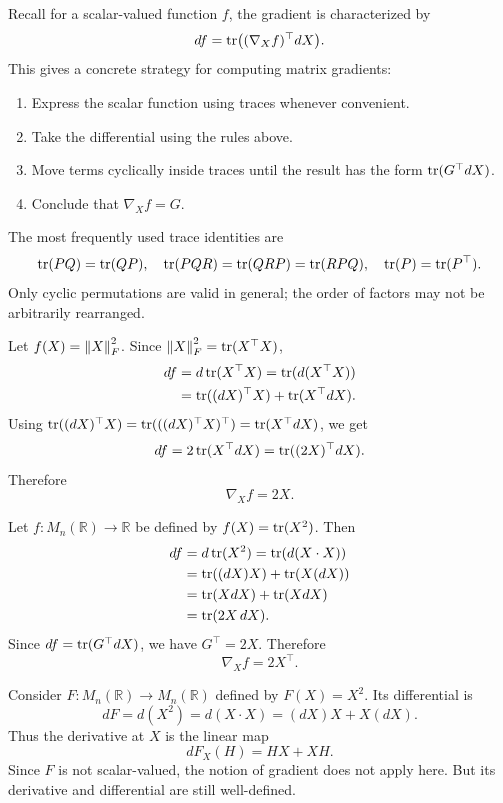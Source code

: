 Recall for a scalar-valued function $f$, the gradient is characterized by
\[
    df=\operatorname{tr}\bigl((\nabla_X f)^{\top} dX\bigr).
\]
This gives a concrete strategy for computing matrix gradients:
\begin{pbox}
 \begin{enumerate}
    \item Express the scalar function using traces whenever convenient.
    \item Take the differential using the rules above.
    \item Move terms cyclically inside traces until the result has the form $\operatorname{tr}(G^{\top} dX)$.
    \item Conclude that $\nabla_X f=G$.
\end{enumerate}   
\end{pbox}

The most frequently used trace identities are
\[
    \operatorname{tr}(PQ)=\operatorname{tr}(QP),
    \quad
    \operatorname{tr}(PQR)=\operatorname{tr}(QRP)=\operatorname{tr}(RPQ),
    \quad
    \operatorname{tr}(P)=\operatorname{tr}(P^{\top}).
\]
Only cyclic permutations are valid in general; the order of factors may not be
arbitrarily rearranged.

\begin{example}
Let $f(X)=\left\lVert X \right\rVert_F^2$. Since $\left\lVert X \right\rVert_F^2=\operatorname{tr}(X^{\top}X)$,
\[
\begin{aligned}
    df
    &=
    d\operatorname{tr}(X^{\top}X)
    =
    \operatorname{tr}(d(X^{\top}X))\\
    &=
    \operatorname{tr}((dX)^{\top}X)+\operatorname{tr}(X^{\top} dX).
\end{aligned}
\]
Using $\operatorname{tr}((dX)^{\top}X)=\operatorname{tr}(((dX)^{\top}X)^{\top})=\operatorname{tr}(X^{\top}dX)$, we get
\[
    df=2\operatorname{tr}(X^{\top}dX)=\operatorname{tr}((2X)^{\top}dX).
\]
Therefore
\[
    \nabla_X f=2X.
\]
\end{example}

\begin{example}
Let $f:M_n(\mathbb{R})\to\mathbb{R}$ be defined by $f(X)=\operatorname{tr}(X^2)$. Then
\[
\begin{aligned}
    df
    &=
    d\operatorname{tr}(X^2)
    =
    \operatorname{tr}(d(X\cdot X))\\
    &=
    \operatorname{tr}((dX)X)+\operatorname{tr}(X(dX))\\
    &=
    \operatorname{tr}(XdX)+\operatorname{tr}(XdX)\\
    &=
    \operatorname{tr}(2X\,dX).
\end{aligned}
\]
Since $df=\operatorname{tr}(G^{\top} dX)$, we have $G^{\top}=2X$. Therefore
\[
    \nabla_X f=2X^{\top}.
\]
\end{example}

\begin{remark}
Consider $F:M_n(\mathbb{R})\to M_n(\mathbb{R})$ defined by $F(X)=X^2$. Its differential is
\[
    dF=d(X^2)=d(X\cdot X)=(dX)X+X(dX).
\]
Thus the derivative at $X$ is the linear map
\[
    dF_X(H)=HX+XH.
\]
Since $F$ is not scalar-valued, the notion of gradient does not apply here. But its derivative and differential are still well-defined.
\end{remark}

